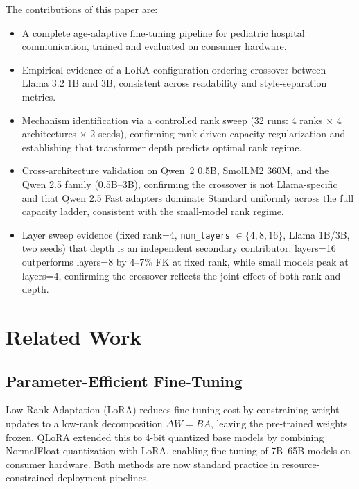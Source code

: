 \documentclass[journal]{IEEEtai}
\begin{document}
\medskip\noindent The contributions of this paper are:
\begin{itemize}
    \item A complete age-adaptive fine-tuning pipeline for pediatric hospital communication, trained and evaluated on consumer hardware.
    \item Empirical evidence of a LoRA configuration-ordering crossover between Llama 3.2 1B and 3B, consistent across readability and style-separation metrics.
    \item Mechanism identification via a controlled rank sweep (32 runs: 4 ranks $\times$ 4 architectures $\times$ 2 seeds), confirming rank-driven capacity regularization and establishing that transformer depth predicts optimal rank regime.
    \item Cross-architecture validation on Qwen~2 0.5B, SmolLM2 360M, and the Qwen 2.5 family (0.5B--3B), confirming the crossover is not Llama-specific and that Qwen 2.5 Fast adapters dominate Standard uniformly across the full capacity ladder, consistent with the small-model rank regime.
    \item Layer sweep evidence (fixed rank=4, \texttt{num\_layers} $\in \{4, 8, 16\}$, Llama 1B/3B, two seeds) that depth is an independent secondary contributor: layers=16 outperforms layers=8 by 4--7\% FK at fixed rank, while small models peak at layers=4, confirming the crossover reflects the joint effect of both rank and depth.
\end{itemize}

\section{Related Work}

\subsection{Parameter-Efficient Fine-Tuning}

Low-Rank Adaptation (LoRA) \cite{hu2022lora} reduces fine-tuning cost by constraining weight updates to a low-rank decomposition $\Delta W = BA$, leaving the pre-trained weights frozen. QLoRA \cite{dettmers2023qlora} extended this to 4-bit quantized base models by combining NormalFloat quantization with LoRA, enabling fine-tuning of 7B--65B models on consumer hardware. Both methods are now standard practice in resource-constrained deployment pipelines.
\end{document}
